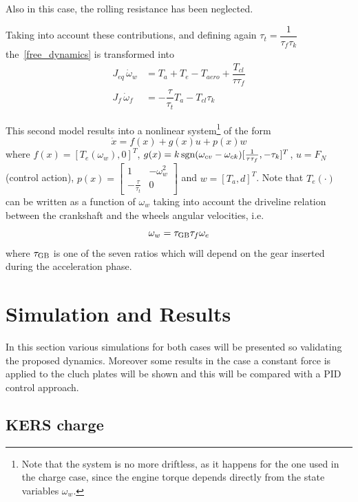 \documentclass[11pt]{article}
\begin{document}
Also in this case, the rolling resistance has been neglected.

Taking into account these contributions, and defining again $\tau_{t} = \dfrac{1}{\tau_f \tau_k}$ the~\eqref{free_dynamics} is transformed into 
\begin{equation}
\begin{split}
J_{eq}\, \dot{\omega}_w & = T_a + T_e - T_{aero} + \dfrac{T_{cl}}{\tau \tau_f}  \\
J_f\, \dot{\omega}_f & = -\dfrac{\tau}{\tau_{t}} T_a - T_{cl} \tau_k
\end{split}
\label{kers_full_dynamics_discharge}
\end{equation}

This second model results into a nonlinear system\footnote{Note that the system is no more driftless, as it happens for the one used in the charge case, since the engine torque depends directly from the state variables $\omega_w$.} of the form
\[
\dot{x} = f(x) + g(x)u + p(x)w 
\]
where $f(x) = [T_e(\omega_w), 0]^T$, $g(x) = k \, \textup{sgn} (\omega_{cv} - \omega_{ck}) [\frac{1}{\tau \tau_f} , -\tau_k]^T$, $u = F_N$ (control action), $p(x) =\left[  \begin{smallmatrix}
1 & -\omega_w^2 \\
-\frac{\tau}{\tau_t} & 0
\end{smallmatrix}\right] $
and $w = [T_a, d]^T$. Note that $T_e(\cdot)$ can be written as a function of $\omega_w$ taking into account the driveline relation between the crankshaft and the wheels angular velocities, i.e.
\begin{equation}
\omega_w = \tau_{\textup{GB}} \tau_f \omega_e
\label{driveline_relation}
\end{equation}
where $\tau_{\textup{GB}}$ is one of the seven ratios which will depend on the gear inserted during the acceleration phase.

\section{Simulation and Results}

In this section various simulations for both cases will be presented so validating the proposed dynamics. Moreover some results in the case a constant force is applied to the cluch plates will be shown and this will be compared with a PID control approach.
\subsection{KERS charge}
\end{document}
